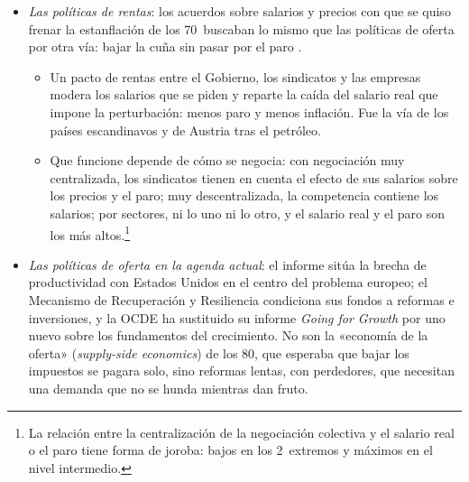 \documentclass[11pt]{article}
\begin{document}
\begin{itemize}
\item \emph{Las políticas de rentas}: los acuerdos sobre salarios y precios con que se quiso frenar la estanflación de los 70~buscaban lo mismo que las políticas de oferta por otra vía: bajar la cuña sin pasar por el paro .
  \begin{itemize}
  \item Un pacto de rentas entre el Gobierno, los sindicatos y las empresas modera los salarios que se piden y reparte la caída del salario real que impone la perturbación: menos paro y menos inflación. Fue la vía de los países escandinavos y de Austria tras el petróleo\nocite{CarlinSoskice2015Macroeconomics}.
  \item Que funcione depende de cómo se negocia: con negociación muy centralizada, los sindicatos tienen en cuenta el efecto de sus salarios sobre los precios y el paro; muy descentralizada, la competencia contiene los salarios; por sectores, ni lo uno ni lo otro, y el salario real y el paro son los más altos\nocite{CalmforsDriffill1988}.\footnote{La relación entre la centralización de la negociación colectiva y el salario real o el paro tiene forma de joroba: bajos en los 2~extremos y máximos en el nivel intermedio.}
  \end{itemize}
\item \emph{Las políticas de oferta en la agenda actual}: el informe  sitúa la brecha de productividad con Estados Unidos en el centro del problema europeo\nocite{CE2024Draghi}; el Mecanismo de Recuperación y Resiliencia condiciona sus fondos a reformas e inversiones\nocite{UE2021Reglamento241}, y la OCDE ha sustituido su informe \emph{Going for Growth} por uno nuevo sobre los fundamentos del crecimiento\nocite{OCDE2026Fundamentos}. No son la «economía de la oferta» (\emph{supply-side economics}) de los 80, que esperaba que bajar los impuestos se pagara solo, sino reformas lentas, con perdedores, que necesitan una demanda que no se hunda mientras dan fruto.
\end{itemize}
\end{document}
